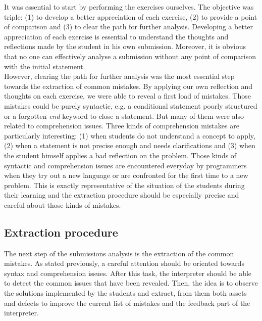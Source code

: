 \documentclass[11pt,a4paper,twoside,openright]{report}
\begin{document}
It was essential to start by performing the exercises ourselves. The objective was
triple: (1) to develop a better appreciation of each exercise, (2) to provide a point 
of comparison and (3) to clear the path for further analysis. Developing a better 
appreciation of each exercise is essential to understand the thoughts and 
reflections made by the student in his own submission. Moreover, it is obvious 
that no one can effectively analyse a submission without any point of comparison
 with the initial statement.\\

However, clearing the path for further analysis was the most essential step towards 
the extraction of common mistakes. By applying our own reflection and thoughts 
on each exercise, we were able to reveal a first load of mistakes. Those 
mistakes could be purely syntactic, e.g. a conditional statement poorly 
structured or a forgotten \textit{end} keyword to close a statement. But many 
of them were also related to comprehension issues. Three kinds of 
comprehension mistakes are particularly interesting: (1) when students do not 
understand a concept to apply, (2) when a statement is not precise enough and 
needs clarifications and (3) when the student himself applies a bad reflection 
on the problem. Those kinds of syntactic and comprehension issues are 
encountered everyday by programmers when they try out a new language or are 
confronted for the first time to a new problem. This is exactly representative 
of the situation of the students during their learning and the extraction 
procedure should be especially precise and careful about those kinds of 
mistakes.\\

\subsection{Extraction procedure}

The next step of the submissions analysis is the extraction of the common 
mistakes. As stated previously, a careful attention should be oriented towards 
syntax and comprehension issues. After this task, the interpreter should be able 
to detect the common issues that have been revealed. Then, the idea is to 
observe 
the solutions implemented by the students and extract, from them both assets and 
defects to improve the current list of mistakes and the feedback part of the 
interpreter.\\
\end{document}
